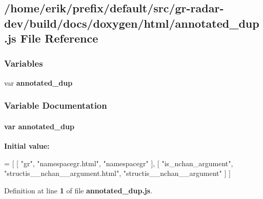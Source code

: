 \subsection{/home/erik/prefix/default/src/gr-\/radar-\/dev/build/docs/doxygen/html/annotated\+\_\+dup.js File Reference}
\label{annotated__dup_8js}
\subsubsection*{Variables}
\begin{DoxyCompactItemize}
\item 
var {\bf annotated\+\_\+dup}
\end{DoxyCompactItemize}


\subsubsection{Variable Documentation}
\paragraph[{annotated\+\_\+dup}]{\setlength{\rightskip}{0pt plus 5cm}var annotated\+\_\+dup}\label{annotated__dup_8js_a3984d1c56eac86ebbabcf0f3233514a2}
{\bfseries Initial value\+:}
\begin{DoxyCode}
=
[
    [ \textcolor{stringliteral}{"gr"}, \textcolor{stringliteral}{"namespacegr.html"}, \textcolor{stringliteral}{"namespacegr"} ],
    [ \textcolor{stringliteral}{"is\_nchan\_argument"}, \textcolor{stringliteral}{"structis\_\_nchan\_\_argument.html"}, \textcolor{stringliteral}{"structis\_\_nchan\_\_argument"} ]
]
\end{DoxyCode}


Definition at line {\bf 1} of file {\bf annotated\+\_\+dup.\+js}.

